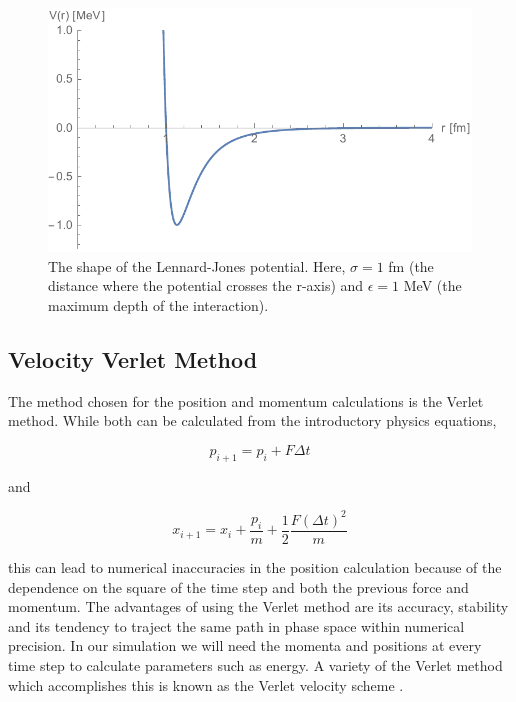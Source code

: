 \documentclass{article}
\begin{document}
\begin{multicols}{2}
\begin{figure}[H]
\begin{center}
\includegraphics[width=\linewidth]{plots/VLJ.pdf}
\caption{The shape of the Lennard-Jones potential.  Here, $\sigma=1$ fm (the distance where the potential crosses the r-axis) and $\epsilon =1$ MeV (the maximum depth of the interaction).}
\label{VLJfig}
\end{center}
\end{figure}

\subsection{Velocity Verlet Method}

The method chosen for the position and momentum calculations is the Verlet method.  While both can be calculated from the introductory physics equations,

\begin{equation}
\label{momeqn}
p_{i+1}=p_i + F \Delta t
\end{equation}

\noindent and

\begin{equation}
\label{poseqn}
x_{i+1} = x_i + \frac{p_i}{m} + \frac{1}{2}\frac{F(\Delta t)^2}{m}
\end{equation}

\noindent this can lead to numerical inaccuracies in the position calculation because of the dependence on the square of the time step and both the previous force and momentum.  The advantages of using the Verlet method are its accuracy, stability and its tendency to traject the same path in phase space within numerical precision.  In our simulation we will need the momenta and positions at every time step to calculate parameters such as energy.  A variety of the Verlet method which accomplishes this is known as the Verlet velocity scheme \cite{verlet}.


\end{multicols}
\end{document}
